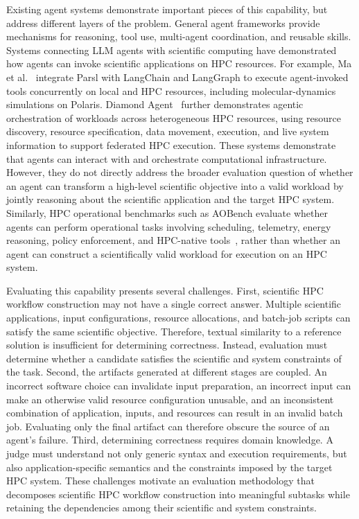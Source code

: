 \documentclass[conference]{IEEEtran}
\begin{document}
Existing agent systems demonstrate important pieces of this capability, but address different layers of the problem. General agent frameworks provide mechanisms for reasoning, tool use, multi-agent coordination, and reusable skills. Systems connecting LLM agents with scientific computing have demonstrated how agents can invoke scientific applications on HPC resources. For example, Ma et al.~\cite{ma2025langchainparsl} integrate Parsl with LangChain and LangGraph to execute agent-invoked tools concurrently on local and HPC resources, including molecular-dynamics simulations on Polaris. Diamond Agent~\cite{diamondagent2026} further demonstrates agentic orchestration of workloads across heterogeneous HPC resources, using resource discovery, resource specification, data movement, execution, and live system information to support federated HPC execution. These systems demonstrate that agents can interact with and orchestrate computational infrastructure. However, they do not directly address the broader evaluation question of whether an agent can transform a high-level scientific objective into a valid workload by jointly reasoning about the scientific application and the target HPC system. Similarly, HPC operational benchmarks such as AOBench evaluate whether agents can perform operational tasks involving scheduling, telemetry, energy reasoning, policy enforcement, and HPC-native tools~\cite{aobench}, rather than whether an agent can construct a scientifically valid workload for execution on an HPC system.

Evaluating this capability presents several challenges. First, scientific HPC workflow construction may not have a single correct answer. Multiple scientific applications, input configurations, resource allocations, and batch-job scripts can satisfy the same scientific objective. Therefore, textual similarity to a reference solution is insufficient for determining correctness. Instead, evaluation must determine whether a candidate satisfies the scientific and system constraints of the task. Second, the artifacts generated at different stages are coupled. An incorrect software choice can invalidate input preparation, an incorrect input can make an otherwise valid resource configuration unusable, and an inconsistent combination of application, inputs, and resources can result in an invalid batch job. Evaluating only the final artifact can therefore obscure the source of an agent's failure. Third, determining correctness requires domain knowledge. A judge must understand not only generic syntax and execution requirements, but also application-specific semantics and the constraints imposed by the target HPC system. These challenges motivate an evaluation methodology that decomposes scientific HPC workflow construction into meaningful subtasks while retaining the dependencies among their scientific and system constraints.
\end{document}
